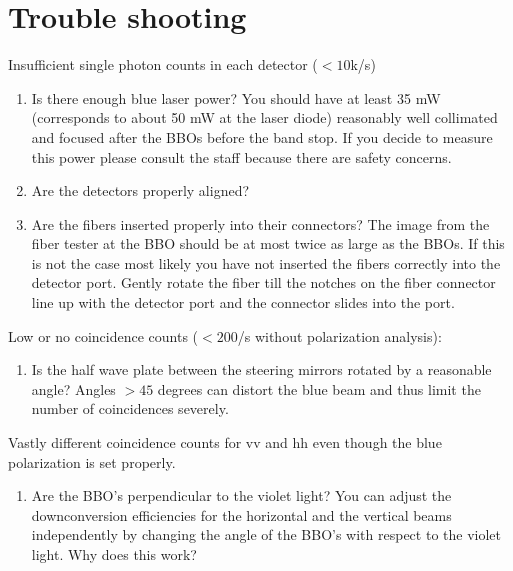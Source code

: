 \documentclass{../lab}
\begin{document}
\begin{figure}[H]
  \label{fig:Qe_slit.jpeg}
\endminipage
\end{figure}

\noindent


\section{Trouble shooting}

Insufficient single photon counts in each detector ($<10$k/s)

\begin{enumerate}
    \item Is there enough blue laser power? You should have at least 35 mW (corresponds to about 50 mW at the laser diode) reasonably well collimated and focused after the BBOs before the band stop. If you decide to measure this power please consult the staff because there are safety concerns.

    \item Are the detectors properly aligned?

    \item Are the fibers inserted properly into their connectors? The image from the fiber tester at the BBO should be at most twice as large as the BBOs. If this is not the case most likely you have not inserted the fibers correctly into the detector port. Gently rotate the fiber till the notches on the fiber connector line up with the detector port and the connector slides into the port.
\end{enumerate}

\noindent Low or no coincidence counts ($<200$/s without polarization analysis):

\begin{enumerate}
    \item Is the half wave plate between the steering mirrors rotated by a reasonable angle? Angles $> 45$ degrees can distort the blue beam and thus limit the number of coincidences severely.
\end{enumerate}

\noindent Vastly different coincidence counts for vv and hh even though the blue polarization is set properly.

\begin{enumerate}
    \item Are the BBO's perpendicular to the violet light? You can adjust the downconversion efficiencies for the horizontal and the vertical beams independently by changing the angle of the BBO's with respect to the violet light. Why does this work?
\end{enumerate}
\end{document}
